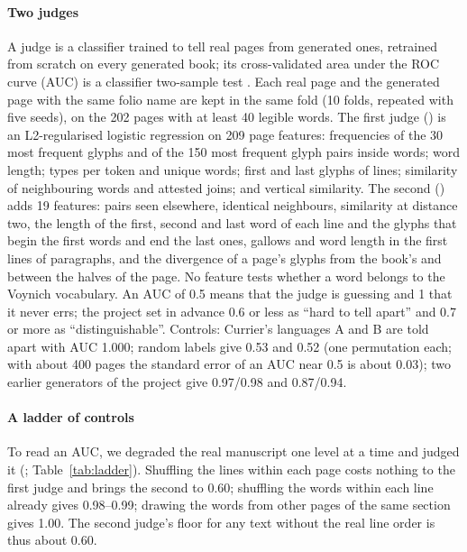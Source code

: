 \paragraph{Two judges} A judge is a classifier trained to tell real pages from generated ones, retrained from scratch on
every generated book; its cross-validated area under the ROC curve (AUC) is a classifier two-sample test
\citep{lopezpaz2017}. Each real page and the generated page with the same folio name are kept in the same fold
(10 folds, repeated with five seeds), on the 202 pages with at least 40 legible words. The first judge
() is an L2-regularised logistic regression on 209 page features: frequencies of the 30 most frequent
glyphs and of the 150 most frequent glyph pairs inside words; word length; types per token and unique words; first and
last glyphs of lines; similarity of neighbouring words and attested joins; and vertical similarity. The second
() adds 19 features: pairs seen elsewhere, identical neighbours, similarity at distance two, the length of the first,
second and last word of each line and the glyphs that begin the first words and end the last ones, gallows and word length in the first lines of paragraphs, and the divergence of
a page's glyphs from the book's and between the halves of the page. No feature tests whether a word belongs to the Voynich
vocabulary. An AUC of 0.5 means that the judge is guessing and 1 that it never errs; the project set in advance 0.6 or
less as ``hard to tell apart'' and 0.7 or more as ``distinguishable''. Controls: Currier's languages A and B are told apart
with AUC 1.000; random labels give 0.53 and 0.52 (one permutation each; with about 400 pages the standard error of an AUC
near 0.5 is about 0.03); two earlier generators of the project give 0.97/0.98 and 0.87/0.94.

\paragraph{A ladder of controls} To read an AUC, we degraded the real manuscript one level at a time and judged it
(; Table~\ref{tab:ladder}). Shuffling the lines within each page costs nothing to the first judge and brings
the second to 0.60; shuffling the words within each line already gives 0.98--0.99; drawing the words from other pages of
the same section gives 1.00. The second judge's floor for any text without the real line order is thus about 0.60.

